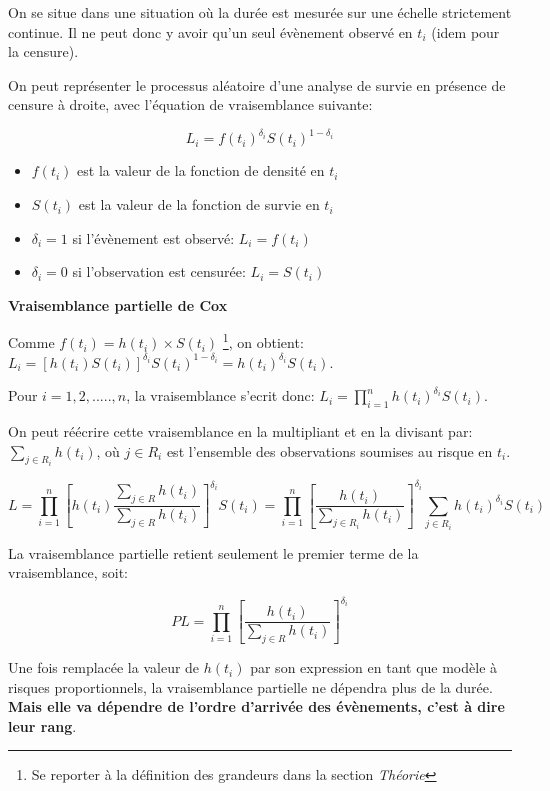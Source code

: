 \documentclass[
  12pt,
  letterpaper,
  DIV=11,
  numbers=noendperiod,
  onepage,
  openany]{scrreprt}
\providecommand{\tightlist}{%
  \setlength{\itemsep}{0pt}\setlength{\parskip}{0pt}}\usepackage{longtable,booktabs,array}
\begin{document}
On se situe dans une situation où la durée est mesurée sur une échelle
strictement continue. Il ne peut donc y avoir qu'un seul évènement
observé en \(t_i\) (idem pour la censure).

On peut représenter le processus aléatoire d'une analyse de survie en
présence de censure à droite, avec l'équation de vraisemblance suivante:

\[L_i=f(t_i)^{\delta_i}S(t_i)^{1-\delta_i}\]

\begin{itemize}
\tightlist
\item
  \(f(t_i)\) est la valeur de la fonction de densité en \(t_i\)
\item
  \(S(t_i)\) est la valeur de la fonction de survie en \(t_i\)
\item
  \(\delta_i=1\) si l'évènement est observé: \(L_i=f(t_i)\)
\item
  \(\delta_i=0\) si l'observation est censurée: \(L_i=S(t_i)\)
\end{itemize}

\textbf{Vraisemblance partielle de Cox}

Comme \(f(t_i)=h(t_i)\times S(t_i)\) \footnote{Se reporter à la
  définition des grandeurs dans la section \emph{Théorie}}, on obtient:
\(L_i=[h(t_i)S(t_i)]^{\delta_i}S(t_i)^{1-\delta_i} = h(t_i)^{\delta_i}S(t_i)\).

Pour \(i=1,2,.....,n\), la vraisemblance s'ecrit donc:
\(L_i=\prod_{i=1}^{n}h(t_i)^{\delta_i}S(t_i)\).

On peut réécrire cette vraisemblance en la multipliant et en la divisant
par: \(\sum_{j\in R_i}h(t_i)\), où \(j\in R_i\) est l'ensemble des
observations soumises au risque en \(t_i\).

\[L=\prod_{i=1}^{n}\left[h(t_i)\frac{\sum_{j\in R}h(t_i)}{\sum_{j\in R}h(t_i)}\right]^{\delta_i}S(t_i)= \prod_{i=1}^{n}\left[\frac{h(t_i)}{\sum_{j\in R_i}h(t_i)}\right]^{\delta_i}\sum_{j\in R_i}h(t_i)^{\delta_i}S(t_i)\]

La vraisemblance partielle retient seulement le premier terme de la
vraisemblance, soit:

\[PL=\prod_{i=1}^{n}\left[\frac{h(t_i)}{\sum_{j\in R}h(t_i)}\right]^{\delta_i}\]

Une fois remplacée la valeur de \(h(t_i)\) par son expression en tant
que modèle à risques proportionnels, la vraisemblance partielle ne
dépendra plus de la durée. \textbf{Mais elle va dépendre de l'ordre
d'arrivée des évènements, c'est à dire leur rang}.
\end{document}
